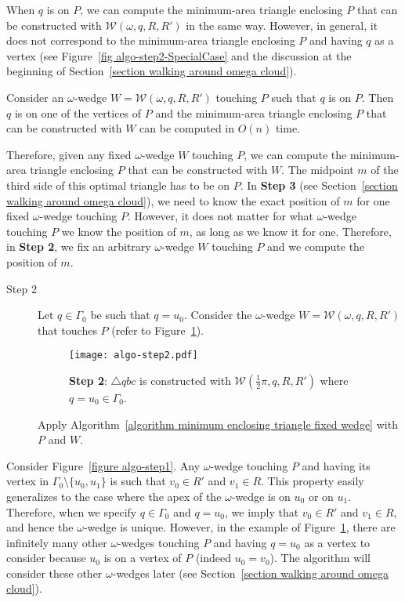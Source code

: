 \documentclass[11pt, oneside]{article}
\def\wedge{\mathcal{W}}
\begin{document}
When $q$ is on $P$,
we can compute
the minimum-area triangle
enclosing $P$ 
that can be constructed with $\wedge(\omega,q,R,R')$ in the same way.
However,
in general,
it does not correspond to the minimum-area triangle
enclosing $P$
and having $q$ as a vertex
(see Figure~\ref{fig algo-step2-SpecialCase}
and the discussion at the beginning of Section~\ref{section walking around omega cloud}).
\begin{corollary}
\label{corollary n-gon wedge minimal triangle}
Consider an $\omega$-wedge $W=\wedge(\omega,q,R,R')$
touching $P$
such that $q$ is on $P$.
Then $q$ is on one of the vertices of $P$
and the minimum-area triangle enclosing $P$ 
that can be constructed with $W$
can be computed in $O(n)$ time. 
\end{corollary}

Therefore,
given any fixed $\omega$-wedge $W$ touching $P$,
we can compute the minimum-area triangle enclosing $P$
that can be constructed with $W$.
The midpoint $m$ of the third side 
of this optimal triangle
has to be on $P$.
In {\bf Step 3}
(see Section~\ref{section walking around omega cloud}),
we need to know the exact position of $m$ 
for one fixed $\omega$-wedge touching $P$.
However,
it does not matter
for what $\omega$-wedge touching $P$
we know the position of $m$,
as long as we know it for one.
Therefore, 
in {\bf Step 2},
we fix an arbitrary $\omega$-wedge $W$ touching $P$
and we compute the position of $m$.

\begin{description}
\item[Step 2] Let $q \in \Gamma_0$ be such that $q=u_0$.
Consider the $\omega$-wedge $W=\wedge(\omega,q,R,R')$ 
that touches $P$
(refer to Figure~\ref{figure algo-step2}).
\begin{figure}
\centering
\texttt{[image: algo-step2.pdf]}
\caption{{\bf Step 2}: 
$\triangle qbc$ is constructed with $\wedge(\frac{1}{2}\pi,q,R,R')$
where $q=u_0\in\Gamma_0$.\label{figure algo-step2}}
\end{figure}
Apply Algorithm~\ref{algorithm minimum enclosing triangle fixed wedge}
with $P$ and $W$.
\end{description}

Consider Figure~\ref{figure algo-step1}.
Any $\omega$-wedge touching $P$ 
and having its vertex in $\Gamma_0\setminus\{u_0,u_1\}$
is such that 
$v_0\in R'$
and $v_1\in R$.
This property easily generalizes to the case 
where the apex of the $\omega$-wedge is on $u_0$ or on $u_1$.
Therefore,
when we specify $q\in \Gamma_0$ and $q=u_0$,
we imply that
$v_0\in R'$
and $v_1\in R$,
and hence the $\omega$-wedge is unique.
However,
in the example of Figure~\ref{figure algo-step2},
there are infinitely many other $\omega$-wedges touching $P$
and having $q=u_0$ as a vertex to consider
because $u_0$ is on a vertex of $P$
(indeed $u_0=v_0$).
The algorithm will consider these other $\omega$-wedges later
(see Section~\ref{section walking around omega cloud}).
\end{document}
